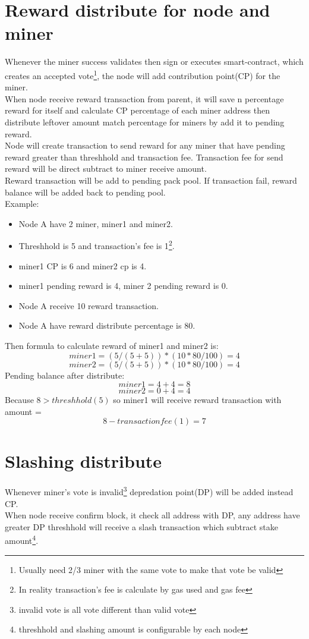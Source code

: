 \documentclass[a4paper, 11pt]{article}
\begin{document}
\section{Reward distribute for node and miner}
Whenever the miner success validates then sign or executes smart-contract, which creates an accepted vote\footnote{Usually need 2/3 miner with the same vote to make that vote be valid}, the node will add contribution point(CP) for the miner. 
\\
When node receive reward transaction from parent, it will save n percentage reward for itself and calculate CP percentage of each miner address 
then distribute leftover amount match percentage for miners by add it to pending reward.
\\
Node will create transaction to send reward for any miner that have pending reward greater than threshhold and transaction fee. 
Transaction fee for send reward will be direct subtract to miner receive amount.
\\
Reward transaction will be add to pending pack pool. If transaction fail, reward balance will be added back to pending pool.
\\
Example:
\begin{itemize}
    \item Node A have 2 miner, miner1 and miner2.
    \item Threshhold is 5 and transaction's fee is 1\footnote{In reality transaction's fee is calculate by gas used and gas fee}.
    \item miner1 CP is 6 and miner2 cp is 4.
    \item miner1 pending reward is 4, miner 2 pending reward is 0.
    \item Node A receive 10 reward transaction.
    \item Node A have reward distribute percentage is 80.
\end{itemize}
Then formula to calculate reward of miner1 and miner2 is:
$$miner1 = (5/(5 + 5)) * (10 * 80/100) = 4$$
$$miner2 = (5/(5 + 5)) * (10 * 80/100) = 4$$
Pending balance after distribute:
$$miner1 = 4 + 4 = 8$$
$$miner2 = 0 + 4 = 4$$
Because $8 > threshhold(5)$ so miner1 will receive reward transaction with amount = $$8 - transaction fee(1) = 7$$
\pagebreak

\section{Slashing distribute}
Whenever miner's vote is invalid\footnote{invalid vote is all vote different than valid vote} depredation point(DP) will be added instead CP.
\\
When node receive confirm block, it check all address with DP, any address have greater DP threshhold will receive a slash transaction which subtract stake amount\footnote{threshhold and slashing amount is configurable by each node}.
\end{document}
